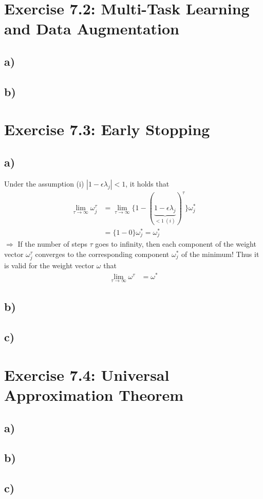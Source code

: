 \documentclass[a4paper]{article}
\begin{document}
    


\newpage
\section*{Exercise 7.2: Multi-Task Learning and Data Augmentation}
    \subsection*{a)}
    
    \subsection*{b)}



\newpage
\section*{Exercise 7.3: Early Stopping}
    \subsection*{a)}
        Under the assumption (i) $|1-\epsilon\lambda_j| < 1$, it holds that
        \begin{align}
            \lim_{\tau \rightarrow \infty} \omega^{\tau}_j &= \lim_{\tau \rightarrow \infty} \{1 - (\underbrace{1 - \epsilon\lambda_j}_{< 1\ (i)})^{\tau}\} \omega^{*}_j\\
            &= \{1 - 0\} \omega^{*}_j = \omega^{*}_j
        \end{align}
        $\Rightarrow$ If the number of steps $\tau$ goes to infinity, then each component of the weight vector $\omega^{\tau}_j$ converges to the corresponding component $\omega^*_j$ of the minimum! Thus it is valid for the weight vector $\omega$ that 
        \begin{align}
            \lim_{\tau \rightarrow \infty} \omega^{\tau} &= \omega^*
        \end{align}
    
    \subsection*{b)}
    
    \subsection*{c)}



\newpage
\section*{Exercise 7.4: Universal Approximation Theorem}
    \subsection*{a)}
    
    \subsection*{b)}
    
    \subsection*{c)}
\end{document}
